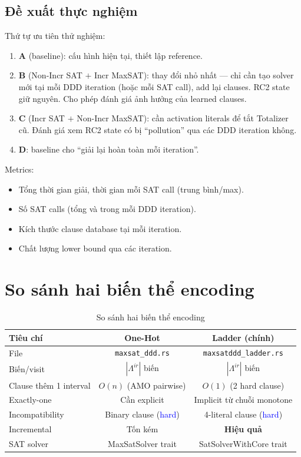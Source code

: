 \documentclass[11pt,a4paper]{article}
\begin{document}
\subsection{Đề xuất thực nghiệm}

Thứ tự ưu tiên thử nghiệm:
\begin{enumerate}
  \item \textbf{A} (baseline): cấu hình hiện tại, thiết lập reference.

  \item \textbf{B} (Non-Incr SAT $+$ Incr MaxSAT): thay đổi nhỏ nhất --- chỉ cần tạo solver mới tại mỗi DDD iteration (hoặc mỗi SAT call), add lại clauses. RC2 state giữ nguyên. Cho phép đánh giá ảnh hưởng của learned clauses.

  \item \textbf{C} (Incr SAT $+$ Non-Incr MaxSAT): cần activation literals để tắt Totalizer cũ. Đánh giá xem RC2 state có bị ``pollution'' qua các DDD iteration không.

  \item \textbf{D}: baseline cho ``giải lại hoàn toàn mỗi iteration''.
\end{enumerate}

Metrics:
\begin{itemize}
  \item Tổng thời gian giải, thời gian mỗi SAT call (trung bình/max).
  \item Số SAT calls (tổng và trong mỗi DDD iteration).
  \item Kích thước clause database tại mỗi iteration.
  \item Chất lượng lower bound qua các iteration.
\end{itemize}


\section{So sánh hai biến thể encoding}

\begin{table}[h]
\centering
\begin{tabular}{lcc}
\toprule
\textbf{Tiêu chí} & \textbf{One-Hot} & \textbf{Ladder (chính)} \\
\midrule
File & \texttt{maxsat\_ddd.rs} & \texttt{maxsatddd\_ladder.rs} \\
Biến/visit & $|\Lambda^{ir}|$ biến & $|\Lambda^{ir}|$ biến \\
Clause thêm 1 interval & $O(n)$ (AMO pairwise) & $O(1)$ (2 hard clause) \\
Exactly-one & Cần explicit & Implicit từ chuỗi monotone \\
Incompatibility & Binary clause (\textcolor{blue}{hard}) & 4-literal clause (\textcolor{blue}{hard}) \\
Incremental & Tốn kém & \textbf{Hiệu quả} \\
SAT solver & MaxSatSolver trait & SatSolverWithCore trait \\
\bottomrule
\end{tabular}
\caption{So sánh hai biến thể encoding}
\end{table}
\end{document}
